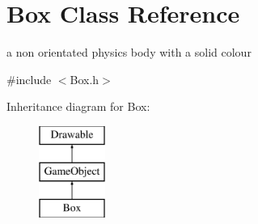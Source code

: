 \hypertarget{class_box}{\section{Box Class Reference}
\label{class_box}
}


a non orientated physics body with a solid colour  




{\ttfamily \#include $<$Box.\+h$>$}

Inheritance diagram for Box\+:\begin{figure}[H]
\begin{center}
\leavevmode
\includegraphics[height=3.000000cm]{class_box}
\end{center}
\end{figure}
